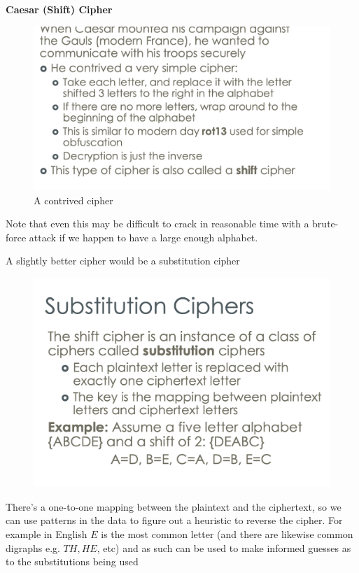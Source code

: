 \documentclass[../notes.tex]{subfiles}
\begin{document}
\begin{definition}
    \textbf{Caesar (Shift) Cipher} 

    \begin{figure}[H]
        \centering
        \includegraphics[width=0.8\linewidth]{img/image_2023-01-30-19-13-50.png}
        \caption{A contrived cipher}
    \end{figure}

    Note that even this may be difficult to crack in reasonable time with a brute-force attack if we happen to have a large enough alphabet.
\end{definition}

\begin{definition}
    A slightly better cipher would be a substitution cipher
    \begin{figure}[H]
        \centering
        \includegraphics[width=0.8\linewidth]{img/image_2023-01-30-19-21-41.png}
    \end{figure}

    There's a one-to-one mapping between the plaintext and the ciphertext, so we can use patterns in the data to figure out a heuristic to reverse the cipher. For example in English $ E $ is the most common letter (and there are likewise common digraphs e.g. $ TH, HE $, etc) and as such can be used to make informed guesses as to the substitutions being used

\end{definition}
\end{document}
